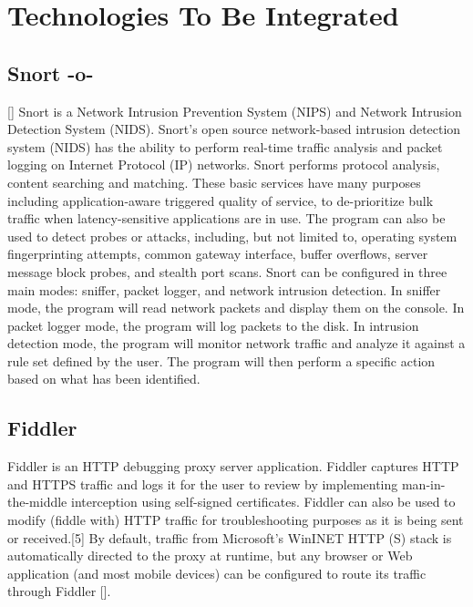 \section{Technologies To Be Integrated}

\subsection{Snort -o-}

 [\cite{www-snort}] Snort is a Network Intrusion Prevention System
(NIPS) and Network Intrusion Detection System (NIDS). Snort's open
source network-based intrusion detection system (NIDS) has the ability
to perform real-time traffic analysis and packet logging on Internet
Protocol (IP) networks. Snort performs protocol analysis, content
searching and matching. These basic services have many purposes
including application-aware triggered quality of service, to
de-prioritize bulk traffic when latency-sensitive applications are in
use.  The program can also be used to detect probes or attacks,
including, but not limited to, operating system fingerprinting
attempts, common gateway interface, buffer overflows, server message
block probes, and stealth port scans.  Snort can be configured in
three main modes: sniffer, packet logger, and network intrusion
detection. In sniffer mode, the program will read network packets and
display them on the console. In packet logger mode, the program will
log packets to the disk. In intrusion detection mode, the program will
monitor network traffic and analyze it against a rule set defined by
the user. The program will then perform a specific action based on
what has been identified.

\subsection{Fiddler}

Fiddler is an HTTP debugging proxy server application. Fiddler
captures HTTP and HTTPS traffic and logs it for the user to review by
implementing man-in-the-middle interception using self-signed
certificates. Fiddler can also be used to modify (fiddle with) HTTP
traffic for troubleshooting purposes as it is being sent or
received.[5] By default, traffic from Microsoft's WinINET HTTP (S)
stack is automatically directed to the proxy at runtime, but any
browser or Web application (and most mobile devices) can be configured
to route its traffic through Fiddler [\cite{www-fiddler}].

